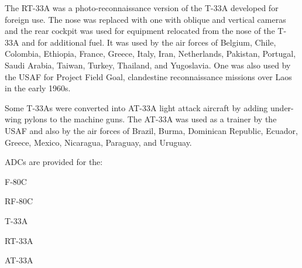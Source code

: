The RT-33A was a photo-reconnaissance version of the T-33A developed for foreign use. The nose was replaced with one with oblique and vertical cameras and the rear cockpit was used for equipment relocated from the nose of the T-33A and for additional fuel. It was used by the air forces of Belgium, Chile, Colombia, Ethiopia, France, Greece, Italy, Iran, Netherlands, Pakistan, Portugal, Saudi Arabia, Taiwan, Turkey, Thailand, and Yugoslavia. One was also used by the USAF for Project Field Goal, clandestine reconnaissance missions over Laos in the early 1960s.

Some T-33As were converted into AT-33A light attack aircraft by adding under-wing pylons to the machine guns. The AT-33A was used as a trainer by the USAF and also by the air forces of Brazil, Burma, Dominican Republic, Ecuador, Greece, Mexico, Nicaragua, Paraguay, and Uruguay.

ADCs are provided for the:
\begin{adclist}
\item F-80C
\item RF-80C
\item T-33A
\item RT-33A
\item AT-33A
\end{adclist}
